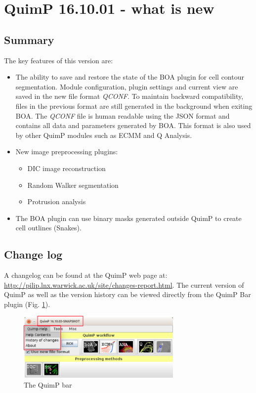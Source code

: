 \documentclass[a4paper,12pt]{article}
\begin{document}
\section{QuimP 16.10.01 - what is new}

\subsection{Summary}
The key features of this version are:
\begin{itemize}
	\item The ability to save and restore the state of the BOA plugin for cell contour segmentation. Module configuration, plugin settings and current view are saved in the new file format \textit{QCONF}. To maintain backward compatibility, files in the previous format are still generated in the background when exiting BOA. The \textit{QCONF} file is human readable using the JSON format and contains all data and parameters generated by BOA. This format is also used by other QuimP modules such as ECMM and Q Analysis. 
	\item New image preprocessing plugins:
	\begin{itemize}
		\item DIC image reconstruction
		\item Random Walker segmentation
		\item Protrusion analysis
	\end{itemize}   
	\item The BOA plugin can use binary masks generated outside QuimP to create cell outlines (Snakes).
\end{itemize}
	
\subsection{Change log}
A changelog can be found at the QuimP web page at: \url{http://pilip.lnx.warwick.ac.uk/site/changes-report.html}.
The current version of QuimP as well as the version history can be viewed directly from the QuimP Bar plugin (Fig. \ref{fig:quimpBar_menu}).
\begin{figure}[ht]
	\centering
	\includegraphics[width=8cm]{quimpBar_menu.png} %
	\caption{The QuimP bar}
	\label{fig:quimpBar_menu}
\end{figure}
 	
\end{document}
